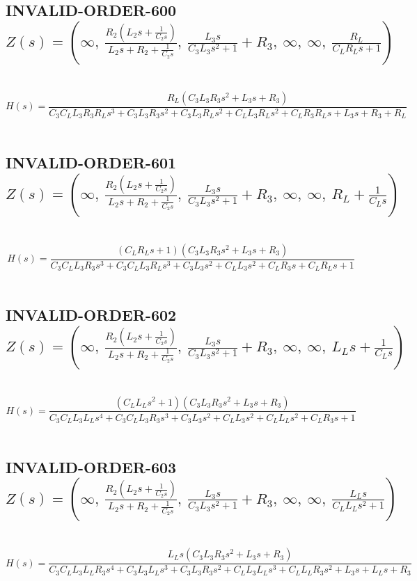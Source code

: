 \documentclass{article}
\begin{document}
\subsection{INVALID-ORDER-600 $Z(s) = \left( \infty, \  \frac{R_{2} \left(L_{2} s + \frac{1}{C_{2} s}\right)}{L_{2} s + R_{2} + \frac{1}{C_{2} s}}, \  \frac{L_{3} s}{C_{3} L_{3} s^{2} + 1} + R_{3}, \  \infty, \  \infty, \  \frac{R_{L}}{C_{L} R_{L} s + 1}\right)$ } \ 
\textbf{\[H(s) = \frac{R_{L} \left(C_{3} L_{3} R_{3} s^{2} + L_{3} s + R_{3}\right)}{C_{3} C_{L} L_{3} R_{3} R_{L} s^{3} + C_{3} L_{3} R_{3} s^{2} + C_{3} L_{3} R_{L} s^{2} + C_{L} L_{3} R_{L} s^{2} + C_{L} R_{3} R_{L} s + L_{3} s + R_{3} + R_{L}}\] } \ 
\subsection{INVALID-ORDER-601 $Z(s) = \left( \infty, \  \frac{R_{2} \left(L_{2} s + \frac{1}{C_{2} s}\right)}{L_{2} s + R_{2} + \frac{1}{C_{2} s}}, \  \frac{L_{3} s}{C_{3} L_{3} s^{2} + 1} + R_{3}, \  \infty, \  \infty, \  R_{L} + \frac{1}{C_{L} s}\right)$ } \ 
\textbf{\[H(s) = \frac{\left(C_{L} R_{L} s + 1\right) \left(C_{3} L_{3} R_{3} s^{2} + L_{3} s + R_{3}\right)}{C_{3} C_{L} L_{3} R_{3} s^{3} + C_{3} C_{L} L_{3} R_{L} s^{3} + C_{3} L_{3} s^{2} + C_{L} L_{3} s^{2} + C_{L} R_{3} s + C_{L} R_{L} s + 1}\] } \ 
\subsection{INVALID-ORDER-602 $Z(s) = \left( \infty, \  \frac{R_{2} \left(L_{2} s + \frac{1}{C_{2} s}\right)}{L_{2} s + R_{2} + \frac{1}{C_{2} s}}, \  \frac{L_{3} s}{C_{3} L_{3} s^{2} + 1} + R_{3}, \  \infty, \  \infty, \  L_{L} s + \frac{1}{C_{L} s}\right)$ } \ 
\textbf{\[H(s) = \frac{\left(C_{L} L_{L} s^{2} + 1\right) \left(C_{3} L_{3} R_{3} s^{2} + L_{3} s + R_{3}\right)}{C_{3} C_{L} L_{3} L_{L} s^{4} + C_{3} C_{L} L_{3} R_{3} s^{3} + C_{3} L_{3} s^{2} + C_{L} L_{3} s^{2} + C_{L} L_{L} s^{2} + C_{L} R_{3} s + 1}\] } \ 
\subsection{INVALID-ORDER-603 $Z(s) = \left( \infty, \  \frac{R_{2} \left(L_{2} s + \frac{1}{C_{2} s}\right)}{L_{2} s + R_{2} + \frac{1}{C_{2} s}}, \  \frac{L_{3} s}{C_{3} L_{3} s^{2} + 1} + R_{3}, \  \infty, \  \infty, \  \frac{L_{L} s}{C_{L} L_{L} s^{2} + 1}\right)$ } \ 
\textbf{\[H(s) = \frac{L_{L} s \left(C_{3} L_{3} R_{3} s^{2} + L_{3} s + R_{3}\right)}{C_{3} C_{L} L_{3} L_{L} R_{3} s^{4} + C_{3} L_{3} L_{L} s^{3} + C_{3} L_{3} R_{3} s^{2} + C_{L} L_{3} L_{L} s^{3} + C_{L} L_{L} R_{3} s^{2} + L_{3} s + L_{L} s + R_{3}}\] } \ 
\end{document}
